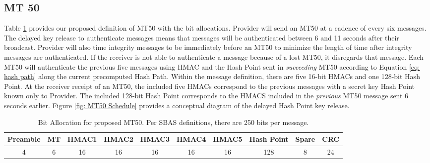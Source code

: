 \documentclass[letterpaper,times]{IONconf/IONconf}
\begin{document}
\subsection{MT 50}

Table \ref{tab: littlemac} provides our proposed definition of MT50 with the bit allocations.
Provider will send an MT50 at a cadence of every six messages.
The delayed key release to authenticate messages means that messages will be authenticated between 6 and 11 seconds after their broadcast.
Provider will also time integrity messages to be immediately before an MT50 to minimize the length of time after integrity messages are authenticated.
If the receiver is not able to authenticate a message because of a lost MT50, it disregards that message.
Each MT50 will authenticate the previous five messages using HMAC and the Hash Point sent in {\em succeeding} MT50 according to Equation \eqref{eq: hash path} along the current precomputed Hash Path.
Within the message definition, there are five 16-bit HMACs and one 128-bit Hash Point.
At the receiver receipt of an MT50, the included five HMACs correspond to the previous messages with a secret key Hash Point known only to Provider.
The included 128-bit Hash Point corresponds to the HMACS included in the {\em previous} MT50 message sent 6 seconds earlier.
Figure \ref{fig: MT50 Schedule} provides a conceptual diagram of the delayed Hash Point key release.

\begin{table}[H]
\center
\begin{tabular}{|c|c|c|c|c|c|c|c|c|c|} \hline
	Preamble & MT & HMAC1 & HMAC2 & HMAC3 & HMAC4 & HMAC5 & Hash Point & Spare & CRC \\ \hline
	4 & 6 & 16 & 16 & 16 & 16 & 16 & 128 & 8 & 24 \\ \hline
\end{tabular}
\caption{Bit Allocation for proposed MT50. Per SBAS definitions, there are 250 bits per message.}
\label{tab: littlemac}
\end{table}{}
\end{document}
